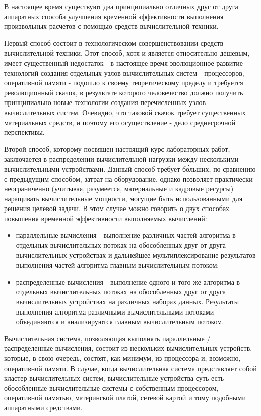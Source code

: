 

В настоящее время существуют два принципиально отличных друг от друга аппаратных способа улучшения временной эффективности выполнения произвольных расчетов с помощью средств вычислительной техники.

Первый способ состоит в технологическом совершенствовании средств вычислительной техники. Этот способ, хотя и является относительно дешевым, имеет существенный недостаток - в настоящее время эволюционное развитие технологий создания отдельных узлов вычислительных систем - процессоров, оперативной памяти - подошло к своему теоретическому пределу и требуется революционный скачок, в результате которого человечество должно получить принципиально новые технологии создания перечисленных узлов вычислительных систем. Очевидно, что таковой скачок требует существенных материальных средств, и поэтому его осуществление - дело среднесрочной перспективы.

Второй способ, которому посвящен настоящий курс лабораторных работ, заключается в распределении вычислительной нагрузки между несколькими вычислительными устройствами. Данный способ требует б\'{о}льших, по сравнению с предыдущим способом, затрат на оборудование, однако позволяет практически неограниченно (учитывая, разумеется, материальные и кадровые ресурсы) наращивать вычислительные мощности, могущие быть использованными для решения целевой задачи. В этом случае можно говорить о двух способах повышения временной эффективности выполняемых вычислений:

\begin{itemize}

	\item параллельные вычисления - выполнение различных частей алгоритма в отдельных вычислительных потоках на обособленных друг от друга вычислительных устройствах и дальнейшее мультиплексирование результатов выполнения частей алгоритма главным вычислительным потоком;

	\item распределенные вычисления - выполнение одного и того же алгоритма в отдельных вычислительных потоках на обособленных друг от друга вычислительных устройствах на различных наборах данных. Результаты выполнения алгоритма различными вычислительными потоками объединяются и анализируются главным вычислительным потоком.

\end{itemize}

Вычислительная система, позволяющая выполнять параллельные / распределенные вычисления, состоит из нескольких вычислительных устройств, которые, в свою очередь, состоят, как минимум, из процессора и, возможно, оперативной памяти. В случае, когда вычислительная система представляет собой кластер вычислительных систем, вычислительные устройства суть есть обособленные вычислительные системы с собственным процессором, оперативной памятью, материнской платой, сетевой картой и тому подобными аппаратными средствами.

